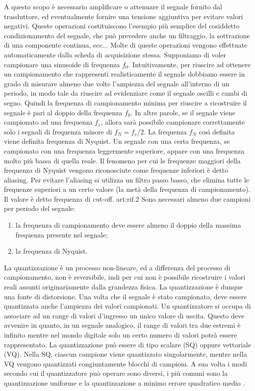 \documentclass[a4paper]{report} %
\begin{document}
A questo scopo è necessario amplificare o attenuare il segnale fornito dal trasduttore, ed eventualmente fornire una tensione aggiuntiva per evitare valori negativi. Queste operazioni costituiscono l'esempio più semplice del cosiddetto condizionamento del segnale, che può prevedere anche un filtraggio, la sottrazione di una componente continua, ecc... Molte di queste operazioni vengono effettuate automaticamente dalla scheda di acquisizione stessa. Supponiamo di voler campionare una sinusoide di frequenza $f_{0}$. Intuitivamente, per riuscire ad ottenere un campionamento che rappresenti realisticamente il segnale dobbiamo essere in grado di misurare almeno due volte l'ampiezza del segnale all'interno di un periodo, in modo tale da riuscire ad evidenziare come il segnale oscilli e cambi di segno. Quindi la frequenza di campionamento minima per riuscire a ricostruire il segnale è pari al doppio della frequenza $f_{0}$. In altre parole, se il segnale viene campionato ad una frequenza $f_{s}$, allora sarà possibile campionare correttamente solo i segnali di frequenza minore di $f_{N}=f_{s}/2$. La frequenza $f_{N}$ così definita viene definita frequenza di Nyquist. Un segnale con una certa frequenza, se campionato con una frequenza leggermente superiore, appare con una frequenza molto più bassa di quella reale. Il fenomeno per cui le frequenze maggiori della frequenza di Nyquist vengono riconosciute come frequenze inferiori è detto aliasing.
Per evitare l'aliasing si utilizza un filtro passo basso, che elimina tutte le frequenze superiori a un certo valore (la metà della frequenza di campionamento). Il valore è detto frequenza di cut-off. {art:rif.2}
Sono necessari almeno due campioni per periodo del segnale:
\begin{enumerate}
\item la frequenza di campionamento deve essere almeno il doppio della massima frequenza presente nel segnale;
\item la frequenza di Nyquist.
\end{enumerate}
La quantizzazione è un processo non-lineare, ed a differenza del processo di campionamento, non è reversibile, indi per cui non è possibile ricostruire i valori reali assunti originariamente dalla grandezza fisica. La quantizzazione è dunque una fonte di distorsione.
Una volta che il segnale è stato campionato, deve essere quantizzata anche l'ampiezza dei valori campionati. Un quantizzatore si occupa di associare ad un range di valori d'ingresso un unico valore di uscita. Questo deve avvenire in quanto, in un segnale analogico, il range di valori tra due estremi è infinito mentre nel mondo digitale solo un certo numero di valori potrà essere rappresentato. La quantizzazione può essere di tipo scalare (SQ) oppure vettoriale (VQ). Nella SQ, ciascun campione viene quantizzato singolarmente, mentre nella VQ vengono quantizzati congiuntamente blocchi di campioni. A sua volta i modi secondo cui il quantizzatore può operare sono diversi, i più comuni sono la quantizzazione uniforme e la quantizzazione a minimo errore quadratico medio \cite{art:rif.4}. 
\end{document}
